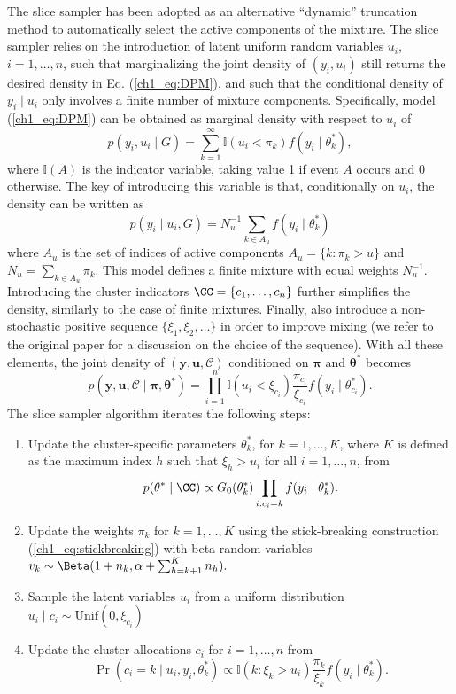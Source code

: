 The slice sampler \citep{walker2007, kalli2011} has been adopted as an alternative ``dynamic'' truncation method to automatically select the active components of the mixture. 
The slice sampler relies on the introduction of latent uniform random variables $u_i$, $i=1,\dots,n$, such that 
marginalizing the joint density of $(y_i,u_i)$ still returns the desired density in Eq. (\ref{ch1_eq:DPM}), and such that the conditional density of $y_i\mid u_i$ only involves a finite number of mixture components.
Specifically, model (\ref{ch1_eq:DPM}) can be obtained as marginal density with respect to $u_i$ of
\begin{equation*}
p(y_i,u_i\mid G) = \sum_{k=1}^{\infty} \mathbb{I}(u_i<\pi_k) f(y_i\mid\theta^*_k),
\end{equation*}
where $\mathbb{I}(A)$ is the indicator variable, taking value 1 if event $A$ occurs and 0 otherwise. 
The key of introducing this variable is that, conditionally on $u_i$, the density can be written as
\begin{equation*}
p(y_i\mid u_i, G) = N_u^{-1} \sum_{k\in A_u} f(y_i\mid\theta^*_k)
\end{equation*}
where $A_u$ is the set of indices of active components $A_u = \{k:\pi_k >u\}$ and $N_u = \sum_{k\in A_u} \pi_k$. This model defines a finite mixture with equal weights $N_u^{-1}$.
Introducing the cluster indicators $\CC = \{c_1,\dots,c_n\}$ further simplifies the density, similarly to the case of finite mixtures. Finally, \citet{kalli2011} also introduce a non-stochastic positive sequence $\{\xi_1,\xi_2,\dots\}$ in order to improve mixing (we refer to the original paper for a discussion on the choice of the sequence). With all these elements, the joint density of $(\bm{y},\bm{u},\mathcal{C})$ conditioned on $\bm{\pi}$ and $\bm{\theta}^*$ becomes
\begin{equation}
p(\bm{y},\bm{u},\mathcal{C} \mid \bm{\pi},\bm{\theta}^*) = \prod_{i=1}^n \mathbb{I}(u_i < \xi_{c_i}) \frac{\pi_{c_i}}{\xi_{c_i}} f(y_i\mid\theta^*_{c_i}).
\label{ch1_eq:sliceDPMlik}
\end{equation}
The slice sampler algorithm iterates the following steps:
\begin{enumerate}
	\item Update the cluster-specific parameters $\theta^*_k$, for $k=1,\dots,K$, where $K$ is defined as the maximum index $h$ such that $\xi_h > u_i$ for all $i=1,\dots,n$, from
	$$p(\theta^*\mid \CC) \propto G_0(\theta^*_k)\prod_{i:c_i=k} f(y_i\mid\theta^*_k).$$
	\item Update the weights $\pi_k$ for $k=1,\dots,K$ using the stick-breaking construction (\ref{ch1_eq:stickbreaking}) with beta random variables $v_k\sim\Beta(1+n_k, \alpha + \sum_{h=k+1}^K n_h).$
	\item Sample the latent variables $u_i$ from a uniform distribution $u_i \mid c_i \sim \mathrm{Unif}(0,\xi_{c_i})$
	\item Update the cluster allocations $c_i$ for $i=1,\dots,n$ from
	$$\Pr(c_i = k\mid u_i, y_i, \theta^*_k)\propto \mathbb{I}(k:\xi_k > u_i) \frac{\pi_k}{\xi_k} f(y_i\mid\theta^*_k).$$
\end{enumerate}



